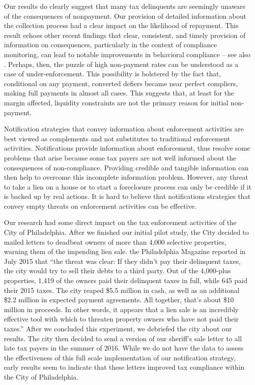 \documentclass[12pt]{article}
\begin{document}
Our results do clearly suggest that many tax delinquents are seemingly
unaware of the consequences of nonpayment. Our provision of detailed
information about the collection process had a clear impact on the
likelihood of repayment. This result echoes other recent findings that
clear, consistent, and timely provision of information on
consequences, particularly in the context of compliance monitoring,
can lead to notable improvements in behavioral compliance -- see also 
. Perhaps, then, the puzzle of high non-payment rates
can be understood as a case of under-enforcement. This possibility is
bolstered by the fact that, conditional on any payment, converted
defiers became near perfect compliers, making full payments in almost
all cases. This suggests that, at least for the margin affected,
liquidity constraints are not the primary reason for initial
non-payment.  

Notification strategies that convey information about enforcement
activities are best viewed as complements and not substitutes to
traditional enforcement activities.  Notifications provide information
about enforcement, thus resolve some problems that arise because some
tax payers are not well informed about the consequences of
non-compliance.  Providing credible and tangible information can then
help to overcome this incomplete information problem.  However, any
threat to take a lien on a house or to start a foreclosure process can
only be credible if it is backed up by real actions. It is hard to
believe that notifications strategies that convey empty threats on
enforcement activities can be effective.

Our research had some direct impact on the tax enforcement activities
of the City of Philadelphia. After we finished our initial pilot
study, the City decided to mailed letters to deadbeat owners of more
than 4,000 selective properties, warning them of the impending lien
sale. the Philadelphia Magazine reported in July 2015 that ``the
threat was clear: If they didn't pay their delinquent taxes, the city
would try to sell their debts to a third party. Out of the 4,000-plus
properties, 1,419 of the owners paid their delinquent taxes in full,
while 645 paid their 2015 taxes. The city reaped \$5.5 million in
cash, as well as an additional \$2.2 million in expected payment
agreements. All together, that's about \$10 million in proceeds. In
other words, it appears that a lien sale is an incredibly effective
tool with which to threaten property owners who have not paid their
taxes.'' After we concluded this experiment, we debriefed the city
about our results. The city then decided to send a version of our
sheriff's sale letter to all late tax payers in the summer of
2016. While we do not have the data to assess the effectiveness of
this full scale implementation of our notification strategy, early
results seem to indicate that these letters improved tax compliance
within the City of Philadelphia.


\newpage



\end{document}
